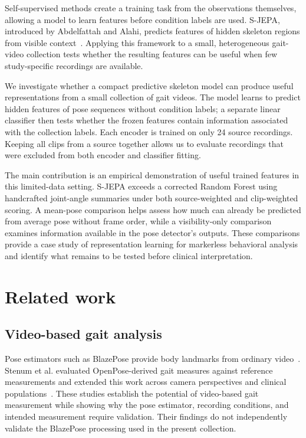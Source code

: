 \documentclass[10pt,twocolumn,letterpaper]{article}
\begin{document}
Self-supervised methods create a training task from the observations themselves, allowing a model to learn features before condition labels are used. S-JEPA, introduced by Abdelfattah and Alahi, predicts features of hidden skeleton regions from visible context~\cite{sjepa}. Applying this framework to a small, heterogeneous gait-video collection tests whether the resulting features can be useful when few study-specific recordings are available.

We investigate whether a compact predictive skeleton model can produce useful representations from a small collection of gait videos. The model learns to predict hidden features of pose sequences without condition labels; a separate linear classifier then tests whether the frozen features contain information associated with the collection labels. Each encoder is trained on only 24 source recordings. Keeping all clips from a source together allows us to evaluate recordings that were excluded from both encoder and classifier fitting.

The main contribution is an empirical demonstration of useful trained features in this limited-data setting. S-JEPA exceeds a corrected Random Forest using handcrafted joint-angle summaries under both source-weighted and clip-weighted scoring. A mean-pose comparison helps assess how much can already be predicted from average pose without frame order, while a visibility-only comparison examines information available in the pose detector's outputs. These comparisons provide a case study of representation learning for markerless behavioral analysis and identify what remains to be tested before clinical interpretation.


\section{Related work}
\subsection{Video-based gait analysis}
Pose estimators such as BlazePose provide body landmarks from ordinary video~\cite{blazepose}.
Stenum et al. evaluated OpenPose-derived gait measures against reference measurements and extended this work across camera perspectives and clinical populations~\cite{stenum2021,stenum2024}. These studies establish the potential of video-based gait measurement while showing why the pose estimator, recording conditions, and intended measurement require validation. Their findings do not independently validate the BlazePose processing used in the present collection.
\end{document}
